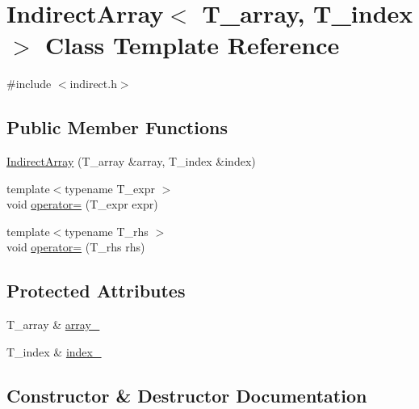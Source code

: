 \hypertarget{classIndirectArray}{}\section{Indirect\+Array$<$ T\+\_\+array, T\+\_\+index $>$ Class Template Reference}
\label{classIndirectArray}


{\ttfamily \#include $<$indirect.\+h$>$}

\subsection*{Public Member Functions}
\begin{DoxyCompactItemize}
\item 
\hyperlink{classIndirectArray_a0983d4cd7d46e7327ce50467c7f388ac}{Indirect\+Array} (T\+\_\+array \&array, T\+\_\+index \&index)
\item 
{\footnotesize template$<$typename T\+\_\+expr $>$ }\\void \hyperlink{classIndirectArray_a68fc5c8a44b8c40ff6128811f92fe961}{operator=} (T\+\_\+expr expr)
\item 
{\footnotesize template$<$typename T\+\_\+rhs $>$ }\\void \hyperlink{classIndirectArray_af892ce97310ffbcb8542e80f88ae3540}{operator=} (T\+\_\+rhs rhs)
\end{DoxyCompactItemize}
\subsection*{Protected Attributes}
\begin{DoxyCompactItemize}
\item 
T\+\_\+array \& \hyperlink{classIndirectArray_adac5f29ea2d36134540235f6975c85fc}{array\+\_\+}
\item 
T\+\_\+index \& \hyperlink{classIndirectArray_aa3c1cbd2ad06a6c2623dbf614589951f}{index\+\_\+}
\end{DoxyCompactItemize}


\subsection{Constructor \& Destructor Documentation}
\hypertarget{classIndirectArray_a0983d4cd7d46e7327ce50467c7f388ac}{}
